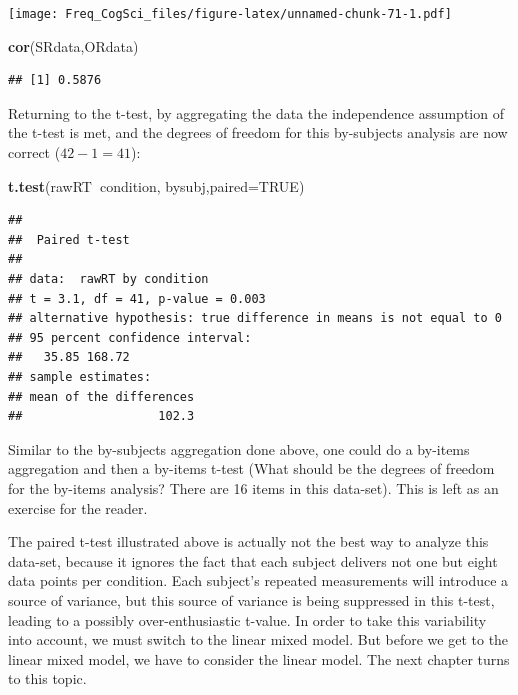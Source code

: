 \documentclass[12pt,]{krantz}
\newenvironment{Shaded}{\begin{snugshade}}{\end{snugshade}}
\newcommand{\DataTypeTok}[1]{\textcolor[rgb]{0.13,0.29,0.53}{#1}}
\newcommand{\KeywordTok}[1]{\textcolor[rgb]{0.13,0.29,0.53}{\textbf{#1}}}
\newcommand{\NormalTok}[1]{#1}
\newcommand{\OperatorTok}[1]{\textcolor[rgb]{0.81,0.36,0.00}{\textbf{#1}}}
\newcommand{\OtherTok}[1]{\textcolor[rgb]{0.56,0.35,0.01}{#1}}
\begin{document}
\texttt{[image: Freq\_CogSci\_files/figure-latex/unnamed-chunk-71-1.pdf]}

\begin{Shaded}
\begin{Highlighting}[]
\KeywordTok{cor}\NormalTok{(SRdata,ORdata)}
\end{Highlighting}
\end{Shaded}

\begin{verbatim}
## [1] 0.5876
\end{verbatim}

Returning to the t-test, by aggregating the data the independence assumption of the t-test is met, and the degrees of freedom for this by-subjects analysis are now correct (\(42-1=41\)):

\begin{Shaded}
\begin{Highlighting}[]
\KeywordTok{t.test}\NormalTok{(rawRT}\OperatorTok{~}\NormalTok{condition, bysubj,}\DataTypeTok{paired=}\OtherTok{TRUE}\NormalTok{)}
\end{Highlighting}
\end{Shaded}

\begin{verbatim}
## 
##  Paired t-test
## 
## data:  rawRT by condition
## t = 3.1, df = 41, p-value = 0.003
## alternative hypothesis: true difference in means is not equal to 0
## 95 percent confidence interval:
##   35.85 168.72
## sample estimates:
## mean of the differences 
##                   102.3
\end{verbatim}

Similar to the by-subjects aggregation done above, one could do a by-items aggregation and then a by-items t-test (What should be the degrees of freedom for the by-items analysis? There are 16 items in this data-set). This is left as an exercise for the reader.

The paired t-test illustrated above is actually not the best way to analyze this data-set, because it ignores the fact that each subject delivers not one but eight data points per condition. Each subject's repeated measurements will introduce a source of variance, but this source of variance is being suppressed in this t-test, leading to a possibly over-enthusiastic t-value. In order to take this variability into account, we must switch to the linear mixed model. But before we get to the linear mixed model, we have to consider the linear model. The next chapter turns to this topic.
\end{document}
